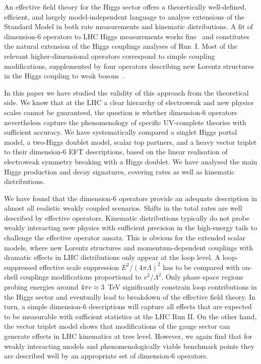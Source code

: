 An effective field theory for the Higgs sector offers a theoretically
well-defined, efficient, and largely model-independent language to
analyse extensions of the Standard Model in both rate measurements and
kinematic distributions. A fit of dimension-6 operators to LHC Higgs
measurements works fine~\cite{Corbett:2015ksa} and constitutes the
natural extension of the Higgs couplings analyses of Run~I.  Most of
the relevant higher-dimensional operators correspond to simple
coupling modifications, supplemented by four operators describing new
Lorentz structures in the Higgs coupling to weak
bosons~\cite{Corbett:2015ksa}.

In this paper we have studied the validity of this approach from the
theoretical side.  We know that at the LHC a clear hierarchy of
electroweak and new physics scales cannot be guaranteed, the question
is whether dimension-6 operators nevertheless capture the
phenomenology of specific UV-complete theories with sufficient
accuracy.  We have systematically compared a singlet Higgs portal
model, a two-Higgs doublet model, scalar top partners, and a heavy
vector triplet to their dimension-6 EFT descriptions, based on the
linear realisation of electroweak symmetry breaking with a Higgs
doublet.  We have analysed the main Higgs production and decay
signatures, covering rates as well as kinematic distributions.

We have found that the dimension-6 operators provide an adequate
description in almost all realistic weakly coupled scenarios. Shifts
in the total rates are well described by effective operators.
Kinematic distributions typically do not probe weakly interacting new
physics with sufficient precision in the high-energy tails to
challenge the effective operator ansatz.  This is obvious for the
extended scalar models, where new Lorentz structures and
momentum-dependent couplings with dramatic effects in LHC
distributions only appear at the loop level.  A loop-suppressed
effective scale suppression $E^2/(4 \pi \Lambda)^2$ has to be compared
with on-shell couplings modifications proportional to $v^2/\Lambda^2$.
Only phase space regions probing energies around $4 \pi v \approx
3$~TeV significantly constrain loop contributions in the Higgs sector
and eventually lead to breakdown of the effective field theory. In
turn, a simple dimension-6 descriptions will capture all effects that
are expected to be measurable with sufficient statistics at the LHC
Run II.  On the other hand, the vector triplet model shows that
modifications of the gauge sector can generate effects in LHC
kinematics at tree level. However, we again find that for weakly
interacting models and phenomenologically viable benchmark points they
are described well by an appropriate set of dimension-6
operators.

